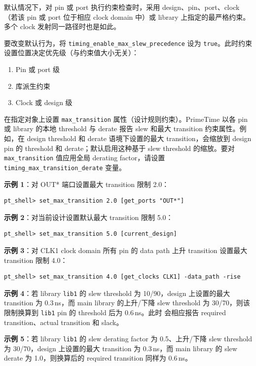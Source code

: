 默认情况下，对 pin 或 port 执行约束检查时，采用 design、pin、port、clock（若该 pin 或 port 位于相应 clock domain 中）或 library 上指定的最严格约束。多个 clock 发射同一路径时也是如此。

要改变默认行为，将 \texttt{timing\_enable\_max\_slew\_precedence} 设为 \texttt{true}。此时约束设置位置决定优先级（与约束值大小无关）：
\begin{enumerate}
  \item Pin 或 port 级
  \item 库派生约束
  \item Clock 或 design 级
\end{enumerate}

 在指定对象上设置 \texttt{max\_transition} 属性（设计规则约束）。PrimeTime 以各 pin 或 library 的本地 threshold 与 derate 报告 slew 和最大 transition 约束属性。例如，在 design threshold 和 derate 语境下设置的最大 transition，会缩放到 design pin 的 threshold 和 derate；默认启用这种基于 slew threshold 的缩放。要对 \texttt{max\_transition} 值应用全局 derating factor，请设置 \texttt{timing\_max\_transition\_derate} 变量。

\textbf{示例 1}：对 OUT* 端口设置最大 transition 限制 2.0：
\begin{lstlisting}
pt_shell> set_max_transition 2.0 [get_ports "OUT*"]
\end{lstlisting}

\textbf{示例 2}：对当前设计设置默认最大 transition 限制 5.0：
\begin{lstlisting}
pt_shell> set_max_transition 5.0 [current_design]
\end{lstlisting}

\textbf{示例 3}：对 CLK1 clock domain 所有 pin 的 data path 上升 transition 设置最大 transition 限制 4.0：
\begin{lstlisting}
pt_shell> set_max_transition 4.0 [get_clocks CLK1] -data_path -rise
\end{lstlisting}

\textbf{示例 4}：若 library \texttt{lib1} 的 slew threshold 为 10/90，design 上设置的最大 transition 为 0.3\,ns，而 main library 的上升/下降 slew threshold 为 30/70，则该限制换算到 \texttt{lib1} pin 的 threshold 后为 0.6\,ns。此时  会相应报告 required transition、actual transition 和 slack。

\textbf{示例 5}：若 library \texttt{lib1} 的 slew derating factor 为 0.5、上升/下降 slew threshold 为 30/70，design 上设置的最大 transition 为 0.3\,ns，而 main library 的 slew derate 为 1.0，则换算后的 required transition 同样为 0.6\,ns。

